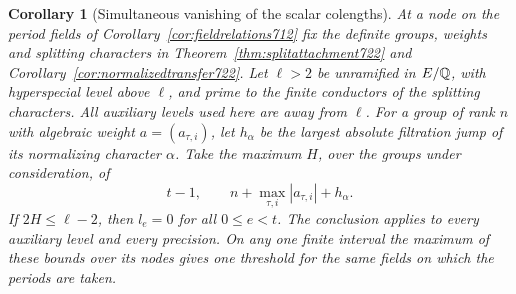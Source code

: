 \documentclass[a4paper,11pt]{article}
\newtheorem{corollary}[proposition]{Corollary}
\theoremstyle{definition}
\theoremstyle{remark}
\numberwithin{equation}{section}
\begin{document}
\begin{corollary}[Simultaneous vanishing of the scalar colengths]\leavevmode
\label{cor:scalarfl724}
At a node on the period fields of Corollary~\ref{cor:fieldrelations712}
fix the definite groups, weights and splitting characters in
Theorem~\ref{thm:splitattachment722} and Corollary~\ref{cor:normalizedtransfer722}.
Let \(\ell>2\) be unramified in \(E/\mathbb Q\), with hyperspecial level above
\(\ell\), and prime to the finite conductors of the splitting characters.
All auxiliary levels used here are away from \(\ell\).
For a group of rank \(n\) with algebraic weight \(a=(a_{\tau,i})\),
let \(h_\alpha\) be the largest absolute filtration jump of its
normalizing character \(\alpha\). Take the maximum \(H\), over the
groups under consideration, of
\[
             t-1,\qquad n+\max_{\tau,i}|a_{\tau,i}|+h_\alpha .
\]
If \(2H\le\ell-2\), then \(l_e=0\) for all \(0\le e<t\). The conclusion
applies to every auxiliary level and every precision. On any one finite
interval the maximum of these bounds over its nodes gives one threshold
for the same fields on which the periods are taken.
\end{corollary}
\end{document}

